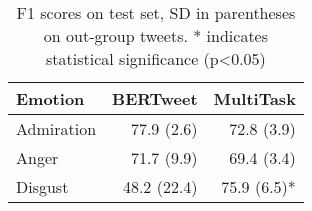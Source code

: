\begin{table}[t]
	\centering
	\begin{tabular}{lrr}
		\toprule
		\textbf{Emotion} & \textbf{BERTweet} & \textbf{MultiTask} \\\midrule
		Admiration & 77.9 (2.6) & 72.8 (3.9)\\
        Anger & 71.7 (9.9) & 69.4 (3.4)\\
        Disgust & 48.2 (22.4) & 75.9 (6.5)*\\\bottomrule
	\end{tabular}
	\caption{F1 scores on test set, SD in parentheses on out-group tweets. * indicates statistical significance (p<0.05)}
	\label{tab:detemoresults}
\end{table}
